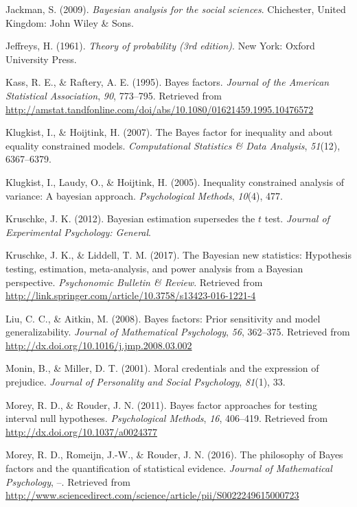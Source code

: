 \documentclass[english,man]{apa6}
\theoremstyle{definition}
\theoremstyle{definition}
\theoremstyle{definition}
\theoremstyle{remark}
\begin{document}
\hypertarget{ref-Jackman:2009}{}
Jackman, S. (2009). \emph{Bayesian analysis for the social sciences}.
Chichester, United Kingdom: John Wiley \& Sons.

\hypertarget{ref-Jeffreys:1961}{}
Jeffreys, H. (1961). \emph{Theory of probability (3rd edition)}. New
York: Oxford University Press.

\hypertarget{ref-Kass:Raftery:1995}{}
Kass, R. E., \& Raftery, A. E. (1995). Bayes factors. \emph{Journal of
the American Statistical Association}, \emph{90}, 773--795. Retrieved
from
\url{http://amstat.tandfonline.com/doi/abs/10.1080/01621459.1995.10476572}

\hypertarget{ref-Klugkist:Hoijtink:2007}{}
Klugkist, I., \& Hoijtink, H. (2007). The Bayes factor for inequality
and about equality constrained models. \emph{Computational Statistics \&
Data Analysis}, \emph{51}(12), 6367--6379.

\hypertarget{ref-Klugkist:etal:2005}{}
Klugkist, I., Laudy, O., \& Hoijtink, H. (2005). Inequality constrained
analysis of variance: A bayesian approach. \emph{Psychological Methods},
\emph{10}(4), 477.

\hypertarget{ref-Kruschke:2012}{}
Kruschke, J. K. (2012). Bayesian estimation supersedes the \(t\) test.
\emph{Journal of Experimental Psychology: General}.

\hypertarget{ref-Kruschke:Liddell:2017}{}
Kruschke, J. K., \& Liddell, T. M. (2017). The Bayesian new statistics:
Hypothesis testing, estimation, meta-analysis, and power analysis from a
Bayesian perspective. \emph{Psychonomic Bulletin \& Review}. Retrieved
from \url{http://link.springer.com/article/10.3758/s13423-016-1221-4}

\hypertarget{ref-Liu:Aitkin:2008}{}
Liu, C. C., \& Aitkin, M. (2008). Bayes factors: Prior sensitivity and
model generalizability. \emph{Journal of Mathematical Psychology},
\emph{56}, 362--375. Retrieved from
\url{http://dx.doi.org/10.1016/j.jmp.2008.03.002}

\hypertarget{ref-Monin:Miller:2001}{}
Monin, B., \& Miller, D. T. (2001). Moral credentials and the expression
of prejudice. \emph{Journal of Personality and Social Psychology},
\emph{81}(1), 33.

\hypertarget{ref-Morey:Rouder:2011}{}
Morey, R. D., \& Rouder, J. N. (2011). Bayes factor approaches for
testing interval null hypotheses. \emph{Psychological Methods},
\emph{16}, 406--419. Retrieved from
\url{http://dx.doi.org/10.1037/a0024377}

\hypertarget{ref-Morey:etal:2016}{}
Morey, R. D., Romeijn, J.-W., \& Rouder, J. N. (2016). The philosophy of
Bayes factors and the quantification of statistical evidence.
\emph{Journal of Mathematical Psychology}, --. Retrieved from
\url{http://www.sciencedirect.com/science/article/pii/S0022249615000723}
\end{document}
